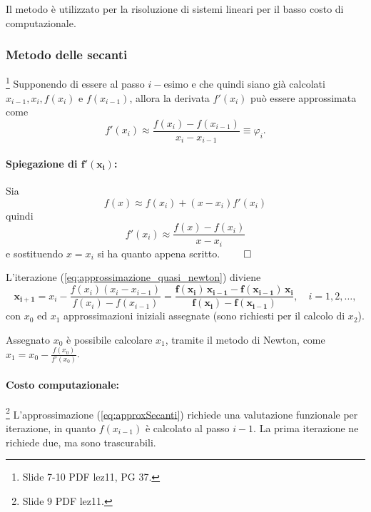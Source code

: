 \noindent Il metodo è utilizzato per la risoluzione di sistemi lineari per il basso costo di computazionale.

\subsubsection{Metodo delle secanti}\label{sssec:metodo_secanti}
\footnote{Slide 7-10 PDF lez11, PG  37.}
Supponendo di essere al passo $i-$esimo e che quindi siano già calcolati $x_{i-1},x_i, f(x_i)$ e $f(x_{i-1})$, allora la derivata $f'(x_i)$ può essere approssimata come 
\begin{equation*}
 	 f'(x_i)\approx\frac{f(x_i)-f(x_{i-1})}{x_i-x_{i-1}}\equiv\varphi_i.
\end{equation*}

\paragraph{Spiegazione di $\boldsymbol{f'(x_i)}$:} Sia
\begin{equation*}
	f(x)\approx f(x_i)+(x-x_i)f'(x_i)
\end{equation*}
quindi 
\begin{equation*}
	 f'(x_i)\approx\frac{f(x)-f(x_{i})}{x-x_i}
\end{equation*}
e sostituendo $x=x_i$ si ha quanto appena scritto. $\qed$

\noindent L'iterazione (\ref{eq:approssimazione_quasi_newton}) diviene
\begin{equation}\label{eq:approxSecanti}
	\boldsymbol{x_{i+1}}=x_i-\frac{f(x_i)(x_i-x_{i-1})}{f(x_i)-f(x_{i-1})}=\boldsymbol{\frac{f(x_i)\,x_{i-1} - f(x_{i-1})\,x_i}{f(x_i)-f(x_{i-1})}}, \quad i=1,2,\hdots,
\end{equation}
con $x_0$ ed $x_1$ approssimazioni iniziali assegnate (sono richiesti per il calcolo di $x_2$).

\begin{remark}
	Assegnato $x_0$ è possibile calcolare $x_1$, tramite il metodo di Newton, come $x_1=x_0-\frac{f(x_0)}{f'(x_0)}$.
\end{remark}

\paragraph{Costo computazionale:}\footnote{Slide 9 PDF lez11.}
L'approssimazione (\ref{eq:approxSecanti}) richiede una valutazione funzionale per iterazione, in quanto $f(x_{i-1})$ è calcolato al passo $i-1$. La prima iterazione ne richiede due, ma sono trascurabili.

